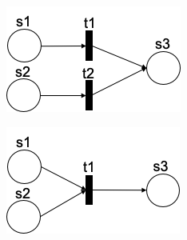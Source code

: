 \begin{figure}
\centering
\begin{minipage}{.5\textwidth}
  \centering
  \includegraphics[width=.8\linewidth]{src/pic/OR.png}
  \label{fig:OR-relationship}
\end{minipage}%
\begin{minipage}{.5\textwidth}
  \centering
  \includegraphics[width=.8\linewidth]{src/pic/AND.png}
  \label{fig:AND-relationship}
\end{minipage}
\end{figure}

